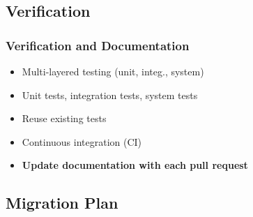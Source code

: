 \documentclass{beamer}
\begin{document}

\subsection[Verification]{Verification}


\begin{frame}

\frametitle{Verification and Documentation}

\begin{itemize}

\item Multi-layered testing (unit, integ., system)
\item Unit tests, integration tests, system tests
\item Reuse existing tests
\item Continuous integration (CI)
\item \textbf{Update documentation with each pull request} %

\end{itemize}

\end{frame}


\subsection[Migration]{Migration Plan}

\end{document}
